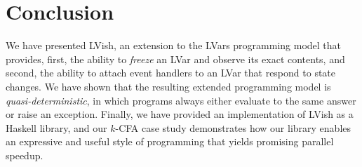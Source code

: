 \section{Conclusion}


We have presented LVish, an extension to the LVars programming model
that provides, first, the ability to \emph{freeze} an LVar and observe
its exact contents, and second, the ability to attach event
handlers to an LVar that respond to state changes.  We have shown that
the resulting extended programming model is \emph{quasi-deterministic}, in
which programs always either evaluate to the same answer or raise an
exception.  Finally, we have provided an implementation of LVish as
a Haskell library, and our $k$-CFA case study demonstrates how our library enables
an expressive and useful style of programming that yields promising parallel speedup.

